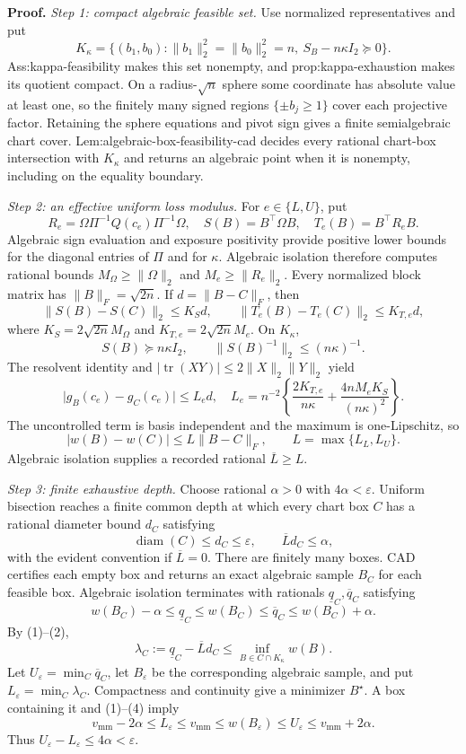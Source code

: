 \textbf{Proof.}
\emph{Step 1: compact algebraic feasible set.}
Use normalized representatives and put
\[
 K_\kappa=\{(b_1,b_0):\lVert b_1\rVert_2^2=\lVert b_0\rVert_2^2=n,\ S_B-n\kappa I_2\succeq0\}.
\]
Ass:kappa-feasibility makes this set nonempty, and prop:kappa-exhaustion makes its quotient compact.  On a radius-\(\sqrt n\) sphere some coordinate has absolute value at least one, so the finitely many signed regions \(\{\pm b_j\ge1\}\) cover each projective factor.  Retaining the sphere equations and pivot sign gives a finite semialgebraic chart cover.  Lem:algebraic-box-feasibility-cad decides every rational chart-box intersection with \(K_\kappa\) and returns an algebraic point when it is nonempty, including on the equality boundary.

\emph{Step 2: an effective uniform loss modulus.}
For \(e\in\{L,U\}\), put
\[
 R_e=\Omega\Pi^{-1}Q(c_e)\Pi^{-1}\Omega,
 \quad S(B)=B^{\top}\Omega B,
 \quad T_e(B)=B^{\top}R_eB.
\]
Algebraic sign evaluation and exposure positivity provide positive lower bounds for the diagonal entries of \(\Pi\) and for \(\kappa\).  Algebraic isolation therefore computes rational bounds \(M_\Omega\ge\lVert\Omega\rVert_2\) and \(M_e\ge\lVert R_e\rVert_2\).  Every normalized block matrix has \(\lVert B\rVert_F=\sqrt{2n}\).  If \(d=\lVert B-C\rVert_F\), then
\[
 \lVert S(B)-S(C)\rVert_2\le K_Sd,
 \qquad \lVert T_e(B)-T_e(C)\rVert_2\le K_{T,e}d,
\]
where \(K_S=2\sqrt{2n}M_\Omega\) and \(K_{T,e}=2\sqrt{2n}M_e\).  On \(K_\kappa\),
\[
 S(B)\succeq n\kappa I_2,
 \qquad\lVert S(B)^{-1}\rVert_2\le(n\kappa)^{-1}.
\]
The resolvent identity and \(\lvert\operatorname{tr}(XY)\rvert\le2\lVert X\rVert_2\lVert Y\rVert_2\) yield
\[
 \lvert g_B(c_e)-g_C(c_e)\rvert\le L_ed,
 \quad
 L_e=n^{-2}\left\{\frac{2K_{T,e}}{n\kappa}
 +\frac{4nM_eK_S}{(n\kappa)^2}\right\}.
\]
The uncontrolled term is basis independent and the maximum is one-Lipschitz, so
\[
 \lvert w(B)-w(C)\rvert\le L\lVert B-C\rVert_F,
 \qquad L=\max\{L_L,L_U\}.
 \tag{1}
\]
Algebraic isolation supplies a recorded rational \(\overline L\ge L\).

\emph{Step 3: finite exhaustive depth.}
Choose rational \(\alpha>0\) with \(4\alpha<\varepsilon\).  Uniform bisection reaches a finite common depth at which every chart box \(C\) has a rational diameter bound \(d_C\) satisfying
\[
 \operatorname{diam}(C)\le d_C\le\varepsilon,
 \qquad \overline Ld_C\le\alpha,
 \tag{2}
\]
with the evident convention if \(\overline L=0\).  There are finitely many boxes.  CAD certifies each empty box and returns an exact algebraic sample \(B_C\) for each feasible box.  Algebraic isolation terminates with rationals \(\underline q_C,\overline q_C\) satisfying
\[
 w(B_C)-\alpha\le\underline q_C\le w(B_C)
 \le\overline q_C\le w(B_C)+\alpha.
 \tag{3}
\]
By (1)--(2),
\[
 \lambda_C:=\underline q_C-\overline Ld_C
 \le\inf_{B\in C\cap K_\kappa}w(B).
 \tag{4}
\]
Let \(U_\varepsilon=\min_C\overline q_C\), let \(B_\varepsilon\) be the corresponding algebraic sample, and put \(L_\varepsilon=\min_C\lambda_C\).  Compactness and continuity give a minimizer \(B^\star\).  A box containing it and (1)--(4) imply
\[
 v_{\mathrm{mm}}-2\alpha\le L_\varepsilon\le v_{\mathrm{mm}}
 \le w(B_\varepsilon)\le U_\varepsilon\le v_{\mathrm{mm}}+2\alpha.
\]
Thus \(U_\varepsilon-L_\varepsilon\le4\alpha<\varepsilon\).

